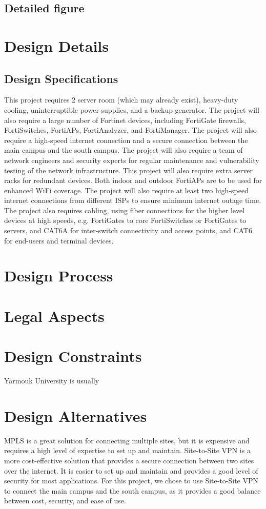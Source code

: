 \documentclass[12pt]{report}
\begin{document}
\subsection{Detailed figure}

\section{Design Details}
\subsection{Design Specifications}
This project requires 2 server room (which may already exist), heavy-duty cooling, uninterruptible power supplies, and a backup generator. The project will also require a large number of Fortinet devices, including FortiGate firewalls, FortiSwitches, FortiAPs, FortiAnalyzer, and FortiManager. The project will also require a high-speed internet connection and a secure connection between the main campus and the south campus. The project will also require a team of network engineers and security experts for regular maintenance and vulnerability testing of the network infrastructure. This project will also require extra server racks for redundant devices. Both indoor and outdoor FortiAPs are to be used for enhanced WiFi coverage. The project will also require at least two high-speed internet connections from different ISPs to ensure minimum internet outage time. The project also requires cabling, using fiber connections for the higher level devices at high speeds, e.g. FortiGates to core FortiSwitches or FortiGates to servers, and CAT6A for inter-switch connectivity and access points, and CAT6 for end-users and terminal devices.

\section{Design Process}

\section{Legal Aspects}

\section{Design Constraints}
Yarmouk University is usually

\section{Design Alternatives}
MPLS is a great solution for connecting multiple sites, but it is expensive and requires a high level of expertise to set up and maintain. Site-to-Site VPN is a more cost-effective solution that provides a secure connection between two sites over the internet. It is easier to set up and maintain and provides a good level of security for most applications. For this project, we chose to use Site-to-Site VPN to connect the main campus and the south campus, as it provides a good balance between cost, security, and ease of use.
\end{document}
